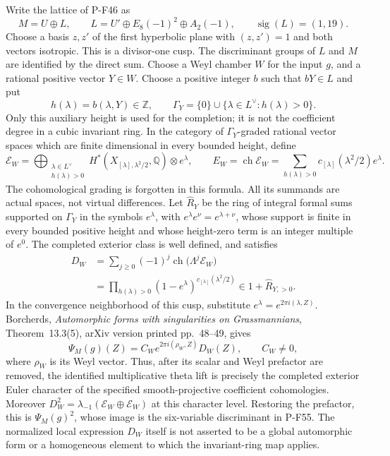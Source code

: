 \documentclass[11pt,a4paper]{article}
\begin{document}
Write the lattice of P-F46 as
\[
 M=U\oplus L,\qquad
 L=U'\oplus E_8(-1)^2\oplus A_2(-1),
 \qquad \operatorname{sig}(L)=(1,19).
 \tag{P-F53h}
\]
Choose a basis $z,z'$ of the first hyperbolic plane with
$(z,z')=1$ and both vectors isotropic. This is a divisor-one
cusp. The discriminant groups of $L$ and $M$ are identified by
the direct sum. Choose a Weyl chamber $W$ for the input $g$,
and a rational positive vector $Y\in W$. Choose a positive integer
$b$ such that $bY\in L$ and put
\[
 h(\lambda)=b(\lambda,Y)\in\mathbb Z,
 \qquad
 \Gamma_Y=\{0\}\cup\{\lambda\in L^\vee:h(\lambda)>0\}.
 \tag{P-F53i}
\]
Only this auxiliary height is used for the completion; it is
not the coefficient degree in a cubic invariant ring.
In the category of $\Gamma_Y$-graded rational vector spaces
which are finite dimensional in every bounded height, define
\[
 \mathcal E_W=
 \bigoplus_{\substack{\lambda\in L^\vee\\h(\lambda)>0}}
 H^*\!\left(X_{[\lambda],\lambda^2/2},\mathbb Q\right)
                         \otimes e^\lambda,
 \qquad
 E_W=\operatorname{ch}\mathcal E_W
     =\sum_{h(\lambda)>0}c_{[\lambda]}(\lambda^2/2)e^\lambda.
 \tag{P-F53j}
\]
The cohomological grading is forgotten in this formula.
All its summands are actual spaces, not virtual differences.
Let $\widehat R_Y$ be the ring of integral formal sums supported
on $\Gamma_Y$ in the symbols $e^\lambda$, with
$e^\lambda e^\nu=e^{\lambda+\nu}$,
whose support is finite in every bounded positive height and
whose height-zero term is an integer multiple of $e^0$.
The completed exterior class is well defined, and satisfies
\[
 \begin{split}
 D_W&=\sum_{j\ge0}(-1)^j
                  \operatorname{ch}\bigl(\Lambda^j\mathcal E_W\bigr)\\
    &=\prod_{h(\lambda)>0}
          (1-e^\lambda)^{c_{[\lambda]}(\lambda^2/2)}
       \in 1+\widehat R_{Y,>0}.
 \end{split}
 \tag{P-F53k}
\]
In the convergence neighborhood of this cusp, substitute
$e^\lambda=e^{2\pi i(\lambda,Z)}$. Borcherds,
\emph{Automorphic forms with singularities on Grassmannians},
Theorem~13.3(5), arXiv version printed pp.~48--49, gives
\[
 \Psi_M(g)(Z)=C_W e^{2\pi i(\rho_W,Z)}D_W(Z),
                       \qquad C_W\ne0,
 \tag{P-F53l}
\]
where $\rho_W$ is its Weyl vector. Thus, after its scalar and
Weyl prefactor are removed, the identified multiplicative
theta lift is precisely the completed exterior Euler character
of the specified smooth-projective coefficient cohomologies.
Moreover $D_W^2=\lambda_{-1}(\mathcal E_W\oplus\mathcal E_W)$
at this character level. Restoring the prefactor, this is
$\Psi_M(g)^2$, whose image is the six-variable discriminant
in P-F55. The normalized local expression $D_W$ itself is
not asserted to be a global automorphic form or a homogeneous
element to which the invariant-ring map applies.
\end{document}
